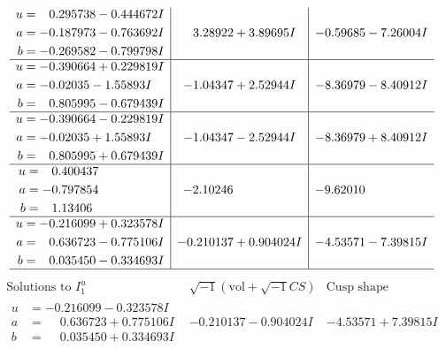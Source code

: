 \documentclass[1p]{elsarticle_modified}
\theoremstyle{definition}
\newcommand{\I}{\sqrt{-1}}
\begin{document}
$$\begin{array}{c|c|c}
\begin{aligned}
u &= \phantom{-}0.295738 - 0.444672 I \\
a &= -0.187973 - 0.763692 I \\
b &= -0.269582 - 0.799798 I\end{aligned}
 & \phantom{-}3.28922 + 3.89695 I & -0.59685 - 7.26004 I \\ \hline\begin{aligned}
u &= -0.390664 + 0.229819 I \\
a &= -0.02035 - 1.55893 I \\
b &= \phantom{-}0.805995 - 0.679439 I\end{aligned}
 & -1.04347 + 2.52944 I & -8.36979 - 8.40912 I \\ \hline\begin{aligned}
u &= -0.390664 - 0.229819 I \\
a &= -0.02035 + 1.55893 I \\
b &= \phantom{-}0.805995 + 0.679439 I\end{aligned}
 & -1.04347 - 2.52944 I & -8.36979 + 8.40912 I \\ \hline\begin{aligned}
u &= \phantom{-}0.400437\phantom{ +0.000000I} \\
a &= -0.797854\phantom{ +0.000000I} \\
b &= \phantom{-}1.13406\phantom{ +0.000000I}\end{aligned}
 & -2.10246\phantom{ +0.000000I} & -9.62010\phantom{ +0.000000I} \\ \hline\begin{aligned}
u &= -0.216099 + 0.323578 I \\
a &= \phantom{-}0.636723 - 0.775106 I \\
b &= \phantom{-}0.035450 - 0.334693 I\end{aligned}
 & -0.210137 + 0.904024 I & -4.53571 - 7.39815 I\\
 \hline 
 \end{array}$$\newpage$$\begin{array}{c|c|c}  
\text{Solutions to }I^u_{1}& \I (\text{vol} + \sqrt{-1}CS) & \text{Cusp shape}\\
 \hline 
\begin{aligned}
u &= -0.216099 - 0.323578 I \\
a &= \phantom{-}0.636723 + 0.775106 I \\
b &= \phantom{-}0.035450 + 0.334693 I\end{aligned}
 & -0.210137 - 0.904024 I & -4.53571 + 7.39815 I \\ \hline\begin{aligned}

\end{aligned}
\end{array}$$
\end{document}
